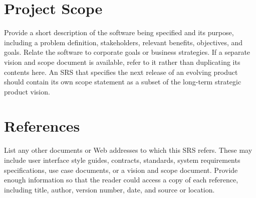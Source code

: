 \section{Project Scope}

Provide a short description of the software being specified and its
purpose, including a problem definition, stakeholders, relevant
benefits, objectives, and goals. Relate the software to corporate
goals or business strategies. If a separate vision and scope document
is available, refer to it rather than duplicating its contents
here. An SRS that specifies the next release of an evolving product
should contain its own scope statement as a subset of the long-term
strategic product vision.

\section{References}

List any other documents or Web addresses to which this SRS
refers. These may include user interface style guides, contracts,
standards, system requirements specifications, use case documents, or
a vision and scope document. Provide enough information so that the
reader could access a copy of each reference, including title, author,
version number, date, and source or location.

